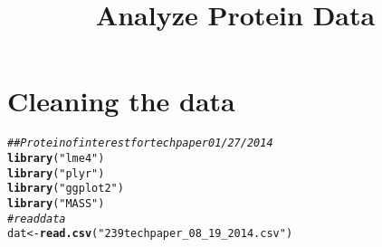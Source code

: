 \documentclass{article}\usepackage[]{graphicx}\usepackage[]{color}
\makeatletter
\newcommand{\hlstr}[1]{\textcolor[rgb]{0.192,0.494,0.8}{#1}}%
\newcommand{\hlcom}[1]{\textcolor[rgb]{0.678,0.584,0.686}{\textit{#1}}}%
\newcommand{\hlstd}[1]{\textcolor[rgb]{0.345,0.345,0.345}{#1}}%
\newcommand{\hlkwb}[1]{\textcolor[rgb]{0.69,0.353,0.396}{#1}}%
\newcommand{\hlkwd}[1]{\textcolor[rgb]{0.737,0.353,0.396}{\textbf{#1}}}%
\newenvironment{kframe}{%
 \def\at@end@of@kframe{}%
 \ifinner\ifhmode%
  \def\at@end@of@kframe{\end{minipage}}%
  \begin{minipage}{\columnwidth}%
 \fi\fi%
 \def\FrameCommand##1{\hskip\@totalleftmargin \hskip-\fboxsep
 \colorbox{shadecolor}{##1}\hskip-\fboxsep
     \hskip-\linewidth \hskip-\@totalleftmargin \hskip\columnwidth}%
 \MakeFramed {\advance\hsize-\width
   \@totalleftmargin\z@ \linewidth\hsize
   \@setminipage}}%
 {\par\unskip\endMakeFramed%
 \at@end@of@kframe}
\newenvironment{knitrout}{}{} %
\makeatother
\begin{document}
\title{Analyze Protein Data}%
\author{} 
\maketitle



\section{Cleaning the data}
\begin{knitrout}
\color{fgcolor}\begin{kframe}
\begin{alltt}
\hlcom{## Protein of interest for tech paper 01/27/2014}
\hlkwd{library}\hlstd{(}\hlstr{"lme4"}\hlstd{)}
\hlkwd{library}\hlstd{(}\hlstr{"plyr"}\hlstd{)}
\hlkwd{library}\hlstd{(}\hlstr{"ggplot2"}\hlstd{)}
\hlkwd{library}\hlstd{(}\hlstr{"MASS"}\hlstd{)}
\hlcom{# read data}
\hlstd{dat} \hlkwb{<-} \hlkwd{read.csv}\hlstd{(}\hlstr{"239 tech paper_08_19_2014.csv"}\hlstd{)}


\end{alltt}
\end{kframe}
\end{knitrout}
\end{document}

